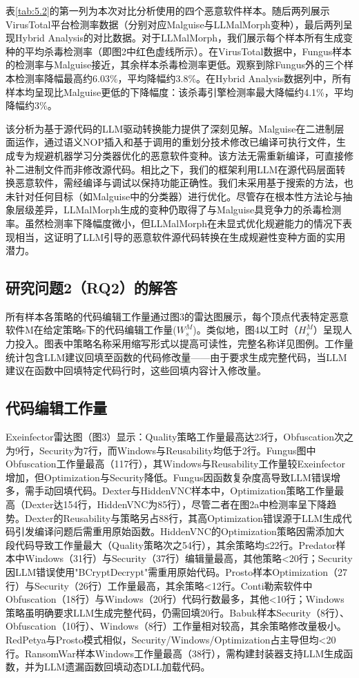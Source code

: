 表\ref{tab:5.2}的第一列为本次对比分析使用的四个恶意软件样本。随后两列展示VirusTotal平台检测率数据（分别对应Malguise与LLMalMorph变种），最后两列呈现Hybrid Analysis的对比数据。对于LLMalMorph，我们展示每个样本所有生成变种的平均杀毒检测率（即图2中红色虚线所示）。在VirusTotal数据中，Fungus样本的检测率与Malguise接近，其余样本杀毒检测率更低。观察到除Fungus外的三个样本检测率降幅最高约6.03\%，平均降幅约3.8\%。在Hybrid Analysis数据列中，所有样本均呈现比Malguise更低的下降幅度：该杀毒引擎检测率最大降幅约4.1\%，平均降幅约3\%。

该分析为基于源代码的LLM驱动转换能力提供了深刻见解。Malguise在二进制层面运作，通过语义NOP插入和基于调用的重划分技术修改已编译可执行文件，生成专为规避机器学习分类器优化的恶意软件变种。该方法无需重新编译，可直接修补二进制文件而非修改源代码。相比之下，我们的框架利用LLM在源代码层面转换恶意软件，需经编译与调试以保持功能正确性。我们未采用基于搜索的方法，也未针对任何目标（如Malguise中的分类器）进行优化。尽管存在根本性方法论与抽象层级差异，LLMalMorph生成的变种仍取得了与Malguise具竞争力的杀毒检测率。虽然检测率下降幅度微小，但LLMalMorph在未显式优化规避能力的情况下表现相当，这证明了LLM引导的恶意软件源代码转换在生成规避性变种方面的实用潜力。

\subsection{研究问题2（RQ2）的解答}
所有样本各策略的代码编辑工作量通过图3的雷达图展示，每个顶点代表特定恶意软件M在给定策略s下的代码编辑工作量($W_{s}^{M}$)。类似地，图4以工时（$H_{s}^{M}$）呈现人力投入。图表中策略名称采用缩写形式以提高可读性，完整名称详见图例。工作量统计包含LLM建议回填至函数的代码修改量——由于要求生成完整代码，当LLM建议在函数中回填特定代码行时，这些回填内容计入修改量。

\subsection{代码编辑工作量}
Exeinfector雷达图（图3）显示：Quality策略工作量最高达23行，Obfuscation次之为9行，Security为7行，而Windows与Reusability均低于2行。Fungus图中Obfuscation工作量最高（117行），其Windows与Reusability工作量较Exeinfector增加，但Optimization与Security降低。Fungus因函数复杂度高导致LLM错误增多，需手动回填代码。Dexter与HiddenVNC样本中，Optimization策略工作量最高（Dexter达154行，HiddenVNC为85行），尽管二者在图2a中检测率呈下降趋势。Dexter的Reusability与策略另占88行，其高Optimization错误源于LLM生成代码引发编译问题后需重用原始函数。HiddenVNC的Optimization策略因需添加大段代码导致工作量最大（Quality策略次之54行），其余策略均≤22行。Predator样本中Windows（31行）与Security（37行）编辑量最高，其他策略<20行；Security因LLM错误使用"BCryptDecrypt"需重用原始代码。Prosto样本Optimization（27行）与Security（26行）工作量最高，其余策略<12行。Conti勒索软件中Obfuscation（18行）与Windows（20行）代码行数最多，其他<10行；Windows策略虽明确要求LLM生成完整代码，仍需回填20行。Babuk样本Security（8行）、Obfuscation（10行）、Windows（8行）工作量相对较高，其余策略修改量极小。RedPetya与Prosto模式相似，Security/Windows/Optimization占主导但均<20行。RansomWar样本Windows工作量最高（38行），需构建封装器支持LLM生成函数，并为LLM遗漏函数回填动态DLL加载代码。

